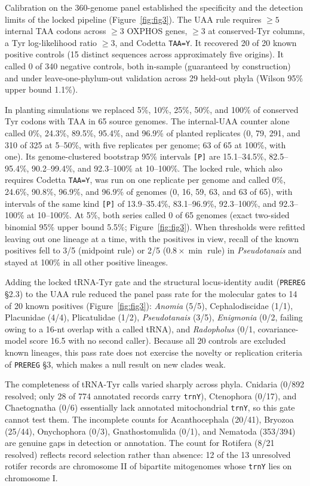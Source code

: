 \documentclass[11pt, a4paper]{article}
\begin{document}
Calibration on the 360-genome panel established the specificity and the detection limits of the locked pipeline (Figure~\ref{fig:fig3}). The UAA rule requires $\ge 5$ internal TAA codons across $\ge 3$ OXPHOS genes, $\ge 3$ at conserved-Tyr columns, a Tyr log-likelihood ratio $\ge 3$, and Codetta \texttt{TAA=Y}. It recovered 20 of 20 known positive controls (15 distinct sequences across approximately five origins). It called 0 of 340 negative controls, both in-sample (guaranteed by construction) and under leave-one-phylum-out validation across 29 held-out phyla (Wilson 95\% upper bound 1.1\%).

In planting simulations we replaced 5\%, 10\%, 25\%, 50\%, and 100\% of conserved Tyr codons with TAA in 65 source genomes. The internal-UAA counter alone called 0\%, 24.3\%, 89.5\%, 95.4\%, and 96.9\% of planted replicates (0, 79, 291, and 310 of 325 at 5--50\%, with five replicates per genome; 63 of 65 at 100\%, with one). Its genome-clustered bootstrap 95\% intervals \texttt{[P]} are 15.1--34.5\%, 82.5--95.4\%, 90.2--99.4\%, and 92.3--100\% at 10--100\%. The locked rule, which also requires Codetta \texttt{TAA=Y}, was run on one replicate per genome and called 0\%, 24.6\%, 90.8\%, 96.9\%, and 96.9\% of genomes (0, 16, 59, 63, and 63 of 65), with intervals of the same kind \texttt{[P]} of 13.9--35.4\%, 83.1--96.9\%, 92.3--100\%, and 92.3--100\% at 10--100\%. At 5\%, both series called 0 of 65 genomes (exact two-sided binomial 95\% upper bound 5.5\%; Figure~\ref{fig:fig3}). When thresholds were refitted leaving out one lineage at a time, with the positives in view, recall of the known positives fell to 3/5 (midpoint rule) or 2/5 ($0.8\times\min$ rule) in \textit{Pseudotanais} and stayed at 100\% in all other positive lineages.

Adding the locked tRNA-Tyr gate and the structural locus-identity audit (\texttt{PREREG} \S 2.3) to the UAA rule reduced the panel pass rate for the molecular gates to 14 of 20 known positives (Figure~\ref{fig:fig3}): \textit{Anomia} (5/5), Cephalodiscidae (1/1), Placunidae (4/4), Plicatulidae (1/2), \textit{Pseudotanais} (3/5), \textit{Enigmonia} (0/2, failing owing to a 16-nt overlap with a called tRNA), and \textit{Radopholus} (0/1, covariance-model score 16.5 with no second caller). Because all 20 controls are excluded known lineages, this pass rate does not exercise the novelty or replication criteria of \texttt{PREREG} \S 3, which makes a null result on new clades weak.

The completeness of tRNA-Tyr calls varied sharply across phyla. Cnidaria (0/892 resolved; only 28 of 774 annotated records carry \texttt{trnY}), Ctenophora (0/17), and Chaetognatha (0/6) essentially lack annotated mitochondrial \texttt{trnY}, so this gate cannot test them. The incomplete counts for Acanthocephala (20/41), Bryozoa (25/44), Onychophora (0/3), Gnathostomulida (0/1), and Nematoda (353/394) are genuine gaps in detection or annotation. The count for Rotifera (8/21 resolved) reflects record selection rather than absence: 12 of the 13 unresolved rotifer records are chromosome II of bipartite mitogenomes whose \texttt{trnY} lies on chromosome I.
\end{document}
